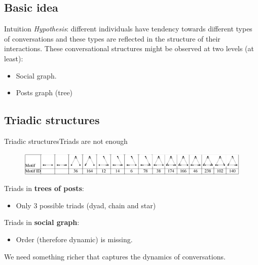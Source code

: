 \documentclass{beamer}
\begin{document}
\subsection{Basic idea}
\begin{frame}{Intuition}
\textit{Hypothesis}: different individuals have tendency towards different types of conversations and these types are reflected in the structure of their interactions.
\vfill
These conversational structures might be observed at two levels (at least):
\begin{itemize}
\item Social graph.
\item Posts graph (tree)
\end{itemize}
\end{frame}


\subsection{Triadic structures}
\begin{frame}{Triadic structures}{Triads are not enough}
	\begin{figure}
		\centering
		\includegraphics[width=1\textwidth]{triads}
	\end{figure}
	
Triads in \textbf{trees of posts}:
	\begin{itemize}
		\item Only 3 possible triads (dyad, chain and star)
	\end{itemize}

Triads in  \textbf{social graph}:
	\begin{itemize}
		\item Order (therefore dynamic) is missing.
	\end{itemize}
\vfill
We need something richer that captures the dynamics of conversations.
\end{frame}
\end{document}
